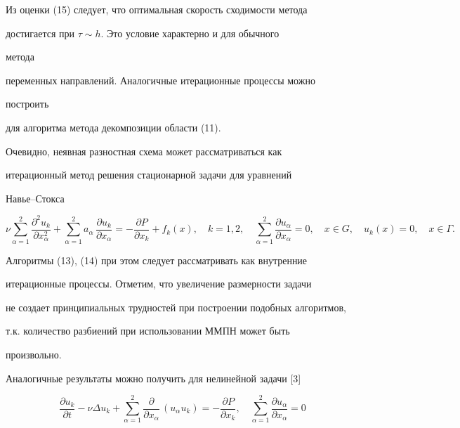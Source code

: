 Из оценки (15) следует, что оптимальная скорость сходимости метода


достигается при $\tau\sim h$. Это условие характерно и для обычного


метода


переменных направлений. Аналогичные итерационные процессы можно


построить


для алгоритма метода декомпозиции области (11).





Очевидно, неявная разностная схема может рассматриваться как


итерационный метод решения стационарной задачи для уравнений


Навье--Стокса


$$


\nu\sum_{\alpha=1}^2\frac{\partial^2u_k}{


\partial x_\alpha^2}+\sum_{\alpha=1}^2a_\alpha\,\frac{\partial


u_k}{\partial


x_\alpha}=-\frac{\partial P}{\partial x_k}+f_k(x),\quad k=1,2,\quad


\sum_{\alpha=1}^2\frac{\partial u_\alpha}{\partial x_\alpha}=0,\quad


x\in G,\quad u_k(x)=0,\quad x\in\Gamma.


$$


Алгоритмы (13), (14) при этом следует рассматривать как внутренние


итерационные процессы. Отметим, что увеличение размерности задачи


не создает принципиальных трудностей при построении подобных алгоритмов,


т.к. количество разбиений при использовании ММПН может быть


произвольно.





Аналогичные результаты можно получить для нелинейной задачи [3]


\begin{equation}


\frac{\partial u_k}{\partial t}-\nu\Delta u_k+


\sum_{\alpha=1}^2\frac{\partial}{\partial x_\alpha}\,(u_\alpha u_k)=


-\frac{\partial P}{\partial x_k},\quad


\sum_{\alpha=1}^2\frac{\partial u_\alpha}{\partial x_\alpha}=0


\end{equation}


